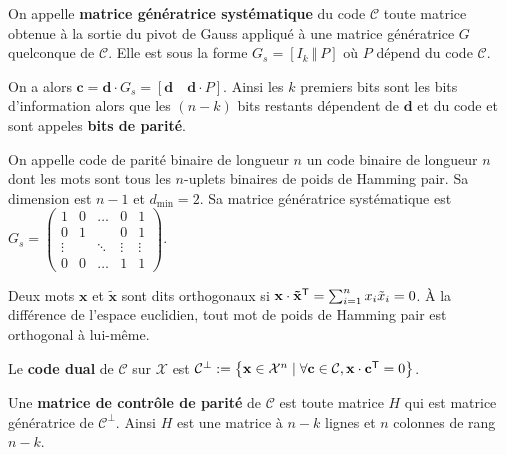 	\begin{defn}
		On appelle \textbf{matrice génératrice systématique} du code $\mathcal{C}$ toute matrice obtenue à la sortie du pivot de Gauss appliqué à une matrice génératrice $G$ quelconque de $\mathcal{C}$.
		Elle est sous la forme $G_s = [ I_k \ \Vert \ P]$ où $P$ dépend du code $\mathcal{C}$.
	\end{defn}

	On a alors $\mathbf{c} = \mathbf{d} \cdot G_s = [\mathbf{d} \quad \mathbf{d} \cdot P]$.
	Ainsi les $k$ premiers bits sont les bits d'information alors que les $(n - k)$ bits restants dépendent de $\mathbf{d}$ et du code et sont appeles \textbf{bits de parité}.

	\begin{ex}
		On appelle code de parité binaire de longueur $n$ un code binaire de longueur $n$ dont les mots sont tous les $n$-uplets binaires de poids de Hamming pair.
		Sa dimension est $n - 1$ et $d_{\min} = 2$.
		Sa matrice génératrice systématique est $G_s = \left( \begin{smallmatrix}
			1	   & 0 & \ldots & 0	  & 1 \\
			0	   & 1 &		    & 0	  & 1 \\
			\vdots &   & \ddots & \vdots & \vdots \\
			0	   & 0 & \ldots & 1	  & 1
			\end{smallmatrix} \right)$.
	\end{ex}

	\begin{defn}
		Deux mots $\mathbf{x}$ et $\mathbf{\tilde{x}}$ sont dits orthogonaux si
		$\mathbf{x} \cdot \mathbf{\tilde{x}}^\mathsf{T} = \sum_{i = 1}^n x_i \tilde{x}_i = 0$.
		À la différence de l'espace euclidien, tout mot de poids de Hamming pair est orthogonal à lui-même.
	\end{defn}

	\begin{defn}
		Le \textbf{code dual} de $\mathcal{C}$ sur $\mathcal{X}$ est
		$\mathcal{C}^\perp := \left\{ \mathbf{x} \in \mathcal{X}^n \mid \forall \mathbf{c} \in \mathcal{C}, \mathbf{x} \cdot \mathbf{c}^\mathsf{T} = 0 \right\}$.
	\end{defn}

	\begin{defn}
		Une \textbf{matrice de contrôle de parité} de $\mathcal{C}$ est toute matrice $H$ qui est matrice génératrice de $\mathcal{C}^\perp$.
		Ainsi $H$ est une matrice à $n - k$ lignes et $n$ colonnes de rang $n - k$.
	\end{defn}

